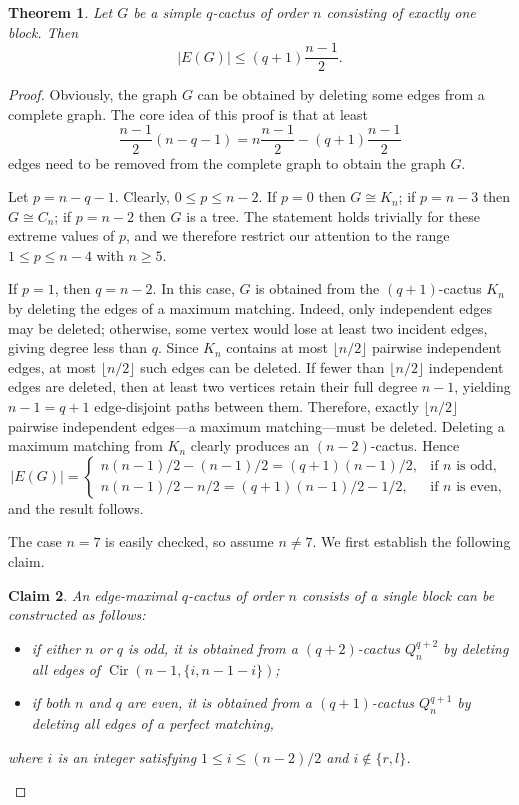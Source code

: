 \documentclass{article}
\newtheorem{theorem}{Theorem}[section]
\newtheorem{claim}[theorem]{Claim}
\begin{document}
\begin{theorem}\label{MTH-101}
Let $G$ be a simple $q$-cactus of order $n$ consisting of exactly one block. Then $$|E(G)|\leq (q+1)\frac{n-1}{2}.$$
\end{theorem}
\begin{proof}
Obviously, the graph $G$ can be obtained by deleting some edges from a complete graph.
The core idea of this proof is that at least $$\frac{n-1}{2}(n-q-1)=n\frac{n-1}{2}-(q+1)\frac{n-1}{2}$$ edges need to be removed from the complete graph to obtain the graph $G$.

Let \(p = n - q - 1\). Clearly, \(0 \le p \le n-2\). If \(p = 0\) then \(G \cong K_n\); if \(p = n-3\) then \(G \cong C_n\); if \(p = n-2\) then \(G\) is a tree. The statement holds trivially for these extreme values of \(p\), and we therefore restrict our attention to the range \(1 \le p \le n-4\) with \(n \ge 5\). 

If \(p=1\), then \(q=n-2\). In this case, \(G\) is obtained from the \((q+1)\)-cactus \(K_n\) by deleting the edges of a maximum matching. Indeed, only independent edges may be deleted; otherwise, some vertex would lose at least two incident edges, giving degree less than \(q\). Since \(K_n\) contains at most \(\lfloor n/2\rfloor\) pairwise independent edges, at most \(\lfloor n/2\rfloor\) such edges can be deleted. If fewer than \(\lfloor n/2\rfloor\) independent edges are deleted, then at least two vertices retain their full degree \(n-1\), yielding \(n-1=q+1\) edge-disjoint paths between them. Therefore, exactly \(\lfloor n/2\rfloor\) pairwise independent edges—a maximum matching—must be deleted. Deleting a maximum matching from \(K_n\) clearly produces an \((n-2)\)-cactus. Hence
\[
|E(G)|=
\begin{cases}
\displaystyle n(n-1)/2-(n-1)/2=(q+1)(n-1)/2, & \text{if } n \text{ is odd},\\
\displaystyle n(n-1)/2-n/2=(q+1)(n-1)/2-1/2, & \text{if } n \text{ is even},
\end{cases}
\]
and the result follows.

The case \(n=7\) is easily checked, so assume \(n\neq 7\). We first establish the following claim.

\begin{claim}
\label{cl:Edge-maximalq-Cactus}
An edge-maximal \(q\)-cactus of order \(n\) consists of a single block can be constructed as follows:
\begin{itemize}
\item if either \(n\) or \(q\) is odd, it is obtained from a \((q+2)\)-cactus \(Q_n^{q+2}\) by deleting all edges of \(\operatorname{Cir}(n-1,\{i,n-1-i\})\);
\item if both \(n\) and \(q\) are even, it is obtained from a \((q+1)\)-cactus \(Q_n^{q+1}\) by deleting all edges of a perfect matching,
\end{itemize}
where \(i\) is an integer satisfying \(1\le i\le (n-2)/2\) and \(i\notin\{r,l\}\).
\end{claim}


\end{proof}
\end{document}
